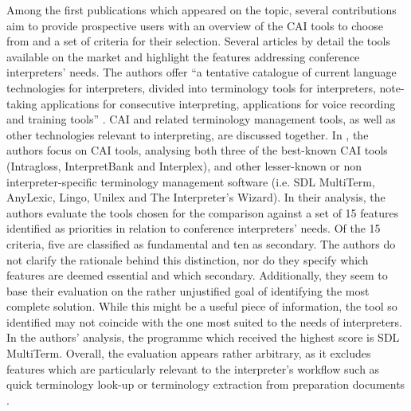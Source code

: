 Among the first publications which appeared on the topic, several contributions aim to provide prospective users with an overview of the CAI tools to choose from and a set of criteria for their selection. Several articles by \citet{costa_technology-assisted_2014,costa_comparative_2014,costa_interpreters_2015} detail the tools available on the market and highlight the features addressing conference interpreters' needs. The authors offer ``a tentative catalogue of current language technologies for interpreters, divided into terminology tools for interpreters, note-taking applications for consecutive interpreting, applications for voice recording and training tools'' \citep[68]{costa_interpreters_2015}. CAI and related terminology management tools, as well as other technologies relevant to interpreting, are discussed together. In \citet{costa_interpreters_2015}, the authors focus on CAI tools, analysing both three of the best-known CAI tools (Intragloss, InterpretBank and Interplex), and other lesser-known or non interpreter-specific terminology management software (i.e. SDL MultiTerm, AnyLexic, Lingo, Unilex and The Interpreter's Wizard). In their analysis, the authors evaluate the tools chosen for the comparison against a set of 15 features identified as priorities in relation to conference interpreters' needs. Of the 15 criteria, five are classified as fundamental and ten as secondary. The authors do not clarify the rationale behind this distinction, nor do they specify which features are deemed essential and which secondary. Additionally, they seem to base their evaluation on the rather unjustified goal of identifying the most complete solution. While this might be a useful piece of information, the tool so identified may not coincide with the one most suited to the needs of interpreters. In the authors' analysis, the programme which received the highest score is SDL MultiTerm. Overall, the evaluation appears rather arbitrary, as it excludes features which are particularly relevant to the interpreter's workflow such as quick terminology look-up or terminology extraction from preparation documents \citep{fantinuoli_interpretbank._2016}.

